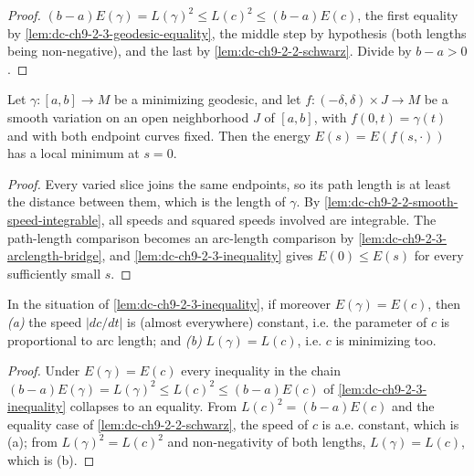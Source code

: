 \begin{proof}
  \leanok
  \sketch
  $(b-a)E(\gamma)=L(\gamma)^2\le L(c)^2\le (b-a)E(c)$, the first equality by
  \cref{lem:dc-ch9-2-3-geodesic-equality}, the middle step by hypothesis (both lengths being
  non-negative), and the last by \cref{lem:dc-ch9-2-2-schwarz}. Divide by $b-a>0$.

\end{proof}
\begin{lemma}
  \label{lem:dc-ch9-2-3-smooth-variation-energy-min}
  \leanok
  Let $\gamma:[a,b]\to M$ be a minimizing geodesic, and let
  $f:(-\delta,\delta)\times J\to M$ be a smooth variation on an open
  neighborhood $J$ of $[a,b]$, with $f(0,t)=\gamma(t)$ and with both endpoint
  curves fixed. Then the energy $E(s)=E(f(s,\cdot))$ has a local minimum at
  $s=0$.
\end{lemma}
\begin{proof}
  \leanok
  \sketch
  Every varied slice joins the same endpoints, so its path length is at least
  the distance between them, which is the length of $\gamma$. By
  \cref{lem:dc-ch9-2-2-smooth-speed-integrable}, all speeds and squared speeds
  involved are integrable. The path-length comparison becomes an arc-length
  comparison by \cref{lem:dc-ch9-2-3-arclength-bridge}, and
  \cref{lem:dc-ch9-2-3-inequality} gives $E(0)\le E(s)$ for every sufficiently
  small $s$.
\end{proof}
\begin{lemma}
  \label{lem:dc-ch9-2-3-equality-case}
  \leanok
  In the situation of \cref{lem:dc-ch9-2-3-inequality}, if moreover $E(\gamma)=E(c)$, then
  \emph{(a)} the speed $|dc/dt|$ is (almost everywhere) constant, i.e. the parameter of $c$
  is proportional to arc length; and \emph{(b)} $L(\gamma)=L(c)$, i.e. $c$ is minimizing too.

\end{lemma}
\begin{proof}
  \leanok
  \sketch
  Under $E(\gamma)=E(c)$ every inequality in the chain
  $(b-a)E(\gamma)=L(\gamma)^2\le L(c)^2\le (b-a)E(c)$ of
  \cref{lem:dc-ch9-2-3-inequality} collapses to an equality. From $L(c)^2=(b-a)E(c)$ and the
  equality case of \cref{lem:dc-ch9-2-2-schwarz}, the speed of $c$ is a.e. constant, which is
  (a); from $L(\gamma)^2=L(c)^2$ and non-negativity of both lengths, $L(\gamma)=L(c)$, which
  is (b).
\end{proof}
